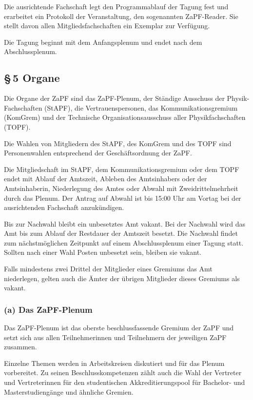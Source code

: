 Die ausrichtende Fachschaft legt den Programmablauf der Tagung fest und
erarbeitet ein Protokoll der Veranstaltung, den sogenannten ZaPF-Reader. Sie
stellt davon allen Mitgliedsfachschaften ein Exemplar zur Verfügung.

Die Tagung beginnt mit dem Anfangsplenum und endet nach dem Abschlussplenum.


\subsection*{§\,5 Organe%
  \label{organe}%
}

Die Organe der ZaPF sind das ZaPF-Plenum, der Ständige Ausschuss der
Physik-Fachschaften (StAPF), die Vertrauenspersonen, das Kommunikationsgremium
(KomGrem) und der Technische Organisationsausschuss aller Physikfachschaften
(TOPF).

Die Wahlen von Mitgliedern des StAPF, des KomGrem und des TOPF sind
Personenwahlen entsprechend der Geschäftsordnung der ZaPF.

Die Mitgliedschaft im StAPF, dem Kommunikationsgremium oder dem TOPF endet mit
Ablauf der Amtszeit, Ableben des Amtsinhabers oder der Amtsinhaberin,
Niederlegung des Amtes oder Abwahl mit Zweidrittelmehrheit durch das Plenum. Der
Antrag auf Abwahl ist bis 15:00 Uhr am Vortag bei der ausrichtenden Fachschaft
anzukündigen.

Bis zur Nachwahl bleibt ein unbesetztes Amt vakant. Bei der Nachwahl wird das
Amt bis zum Ablauf der Restdauer der Amtszeit besetzt.
Die Nachwahl findet zum nächstmöglichen Zeitpunkt auf einem Abschlussplenum
einer Tagung statt.
Sollten nach einer Wahl Posten unbesetzt sein, bleiben sie vakant.

Falls mindestens zwei Drittel der Mitglieder eines Gremiums das Amt niederlegen,
gelten auch die Ämter der übrigen Mitglieder dieses Gremiums als vakant.


\subsubsection*{(a) Das ZaPF-Plenum%
  \label{a-das-zapf-plenum}%
}

Das ZaPF-Plenum ist das oberste beschlussfassende Gremium der ZaPF und setzt
sich aus allen Teilnehmerinnen und Teilnehmern der jeweiligen ZaPF zusammen.

Einzelne Themen werden in Arbeitskreisen diskutiert und für das Plenum vorbereitet.
Zu seinen Beschlusskompetenzen zählt auch die Wahl der Vertreter und Vertreterinnen
für den studentischen Akkreditierungspool für Bachelor- und Masterstudiengänge und
ähnliche Gremien.

